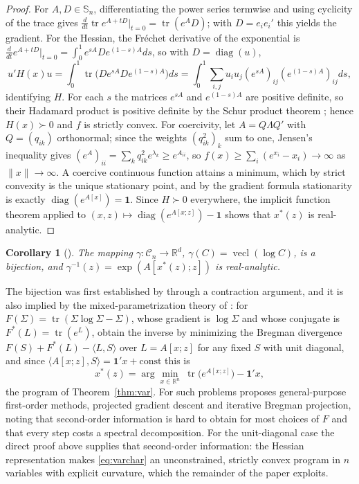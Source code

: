 \documentclass[11pt]{article}
\newcommand{\R}{\mathbb{R}}
\newcommand{\tr}{\operatorname{tr}}
\newcommand{\diag}{\operatorname{diag}}
\newcommand{\vecl}{\operatorname{vecl}}
\newcommand{\one}{\mathbf{1}}
\newcommand{\Sym}{\mathbb{S}_n}
\newcommand{\Cn}{\mathcal{C}_n}
\newtheorem{corollary}{Corollary}
\begin{document}
\begin{proof}
For $A,D\in\Sym$, differentiating the power series termwise and using
cyclicity of the trace gives
$\frac{d}{dt}\tr e^{A+tD}|_{t=0}=\tr(e^{A}D)$; with $D=e_ie_i'$ this
yields the gradient. For the Hessian, the Fr\'echet derivative of the
exponential is
$\frac{d}{dt}e^{A+tD}|_{t=0}=\int_{0}^{1}e^{sA}De^{(1-s)A}ds$, so with
$D=\diag(u)$,
\begin{equation}\label{eq:quadform}
u'H(x)u=\int_{0}^{1}\tr\big(De^{sA}De^{(1-s)A}\big)ds
=\int_{0}^{1}\sum_{i,j}u_iu_j(e^{sA})_{ij}(e^{(1-s)A})_{ij}ds ,
\end{equation}
identifying $H$. For each $s$ the matrices $e^{sA}$ and $e^{(1-s)A}$ are
positive definite, so their Hadamard product is positive definite by the
Schur product theorem \citep[Theorem~5.2.1]{HornJohnson:1991}; hence
$H(x)\succ0$ and $f$ is strictly convex. For coercivity, let
$A=Q\Lambda Q'$ with $Q=(q_{ik})$ orthonormal; since the weights
$(q_{ik}^{2})_k$ sum to one, Jensen's inequality gives
$(e^{A})_{ii}=\sum_k q_{ik}^{2}e^{\lambda_k}\geq e^{A_{ii}}$, so
$f(x)\geq\sum_i(e^{x_i}-x_i)\to\infty$ as $\|x\|\to\infty$. A coercive
continuous function attains a minimum, which by strict convexity is the
unique stationary point, and by the gradient formula stationarity is
exactly $\diag(e^{A[x]})=\one$. Since $H\succ0$ everywhere, the implicit
function theorem applied to $(x,z)\mapsto\diag(e^{A[x;z]})-\one$ shows
that $x^{\ast}(z)$ is real-analytic.
\end{proof}

\begin{corollary}[\citealp{ArchakovHansen:Correlation}]\label{cor:bijection}
The mapping $\gamma:\Cn\to\R^{d}$, $\gamma(C)=\vecl(\log C)$, is a
bijection, and $\gamma^{-1}(z)=\exp(A[x^{\ast}(z);z])$ is real-analytic.
\end{corollary}

The bijection was first established by
\citet{ArchakovHansen:Correlation} through a contraction argument, and
it is also implied by the mixed-parametrization theory of
\citet{Zwiernik:2025}: for $F(\Sigma)=\tr(\Sigma\log\Sigma-\Sigma)$,
whose gradient is $\log\Sigma$ and whose conjugate is
$F^{\ast}(L)=\tr(e^{L})$, \citet[Theorem~5.4, Remark~5.6, and
Section~5.2]{Zwiernik:2025} obtain the inverse by minimizing the
Bregman divergence $F(S)+F^{\ast}(L)-\langle L,S\rangle$ over
$L=A[x;z]$ for any fixed $S$ with unit diagonal, and since
$\langle A[x;z],S\rangle=\one'x+\mathrm{const}$ this is
\begin{equation}\label{eq:varchar}
x^{\ast}(z)=\arg\min_{x\in\R^{n}}\ \tr\big(e^{A[x;z]}\big)-\one'x ,
\end{equation}
the program of Theorem~\ref{thm:var}. For such problems
\citet[Section~6]{Zwiernik:2025} proposes general-purpose first-order
methods, projected gradient descent and iterative Bregman projection,
noting that second-order information is hard to obtain for most
choices of $F$ and that every step costs a spectral decomposition. For
the unit-diagonal case the direct proof above supplies that
second-order information: the Hessian representation makes
\eqref{eq:varchar} an unconstrained, strictly convex program in $n$
variables with explicit curvature, which the remainder of the paper
exploits.
\end{document}
